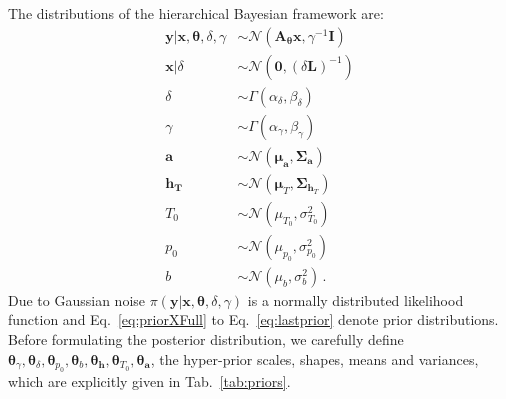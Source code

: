 \clearpage
\noindent
The distributions of the hierarchical Bayesian framework are:
\begin{subequations}
	\label{eq:BayMode}
	\begin{align}
		\bm{y} |  \bm{x},\bm{\theta},\delta,\gamma  &\sim \mathcal{N}(\bm{A}_{\bm{\theta}}  \bm{x}, \gamma^{-1} \bm{I}) \label{eq:likelihoodFull} \\
		\bm{x}| \delta  &\sim \mathcal{N}(\bm{0}, (\delta \bm{L})^{-1} ) \label{eq:priorXFull} \\
		\delta  &\sim \Gamma(\alpha_{\delta} , \beta_{\delta} )\label{eq:priorDelFull} \\
		\gamma  &\sim \Gamma(\alpha_{\gamma}, \beta_{\gamma})\label{eq:priorGamFull} \\
		\bm{a}  &\sim \mathcal{N}(\bm{\mu}_{\bm{a}}, \bm{\Sigma}_{\bm{a}})\\
		\bm{h}_{\bm{T}}  &\sim \mathcal{N}(\bm{\mu}_{T}, \bm{\Sigma}_{\bm{h}_T}) \\
		T_0  &\sim \mathcal{N}(\mu_{T_0}, \sigma^2_{T_0} )\\
		p_0  &\sim \mathcal{N}(\mu_{p_0}, \sigma^2_{p_0} )\\
		b  &\sim \mathcal{N}(\mu_b, \sigma^2_b )  \label{eq:lastprior}  \, .
	\end{align}
\end{subequations}
Due to Gaussian noise $\pi(\bm{y} |  \bm{x},\bm{\theta},\delta,\gamma )$ is a normally distributed likelihood function and Eq.~\ref{eq:priorXFull} to Eq.~\ref{eq:lastprior} denote prior distributions.
Before formulating the posterior distribution, we carefully define $\bm{\theta}_{\gamma}, \bm{\theta}_{\delta},\bm{\theta}_{p_0},\bm{\theta}_{b},\bm{\theta}_{\bm{h}},\bm{\theta}_{T_0},\bm{\theta}_{\bm{a}}$, the hyper-prior scales, shapes, means and variances, which are explicitly given in Tab.~\ref{tab:priors}.

